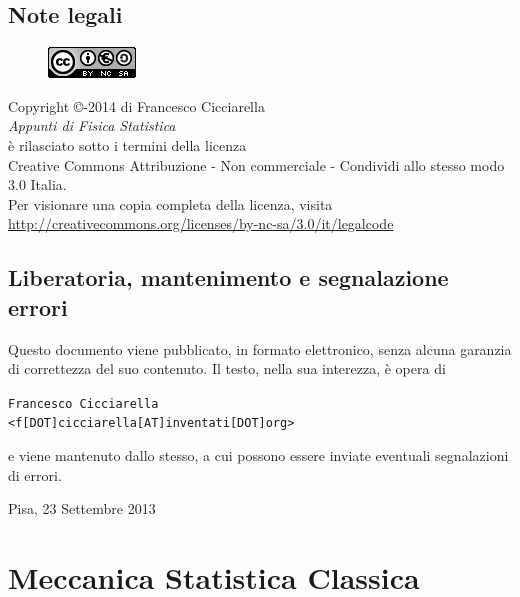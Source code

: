 \documentclass[10pt,a4paper]{report}
\theoremstyle{definition}
\numberwithin{equation}{section}
\begin{document}
\section*{Note legali}
\begin{center}
\begin{figure}[htbp]
\centering
\includegraphics[scale=1]{Addons/88x31.png}
\end{figure}
\vspace{0.5cm}
Copyright \copyright {}-2014 di Francesco Cicciarella \\
\textit{Appunti di Fisica Statistica} \\	
è rilasciato sotto i termini della licenza \\
Creative Commons Attribuzione - Non commerciale - Condividi allo stesso modo 3.0 Italia. \\
Per visionare una copia completa della licenza, visita \\
\url{http://creativecommons.org/licenses/by-nc-sa/3.0/it/legalcode}
\end{center}
\section*{Liberatoria, mantenimento e segnalazione errori}
Questo documento viene pubblicato, in formato elettronico, senza alcuna garanzia di correttezza del suo contenuto. Il testo, nella sua interezza, è opera di \\

\vspace{0.3cm}
\begin{flushleft}
\texttt{Francesco Cicciarella}\\
\texttt{<f[DOT]cicciarella[AT]inventati[DOT]org>}
\end{flushleft}
\vspace{0.3cm}
e viene mantenuto dallo stesso, a cui possono essere inviate eventuali segnalazioni di errori.
\vspace{1cm}
\begin{flushright}
Pisa, 23 Settembre 2013
\end{flushright}
\pagebreak


\tableofcontents
\pagebreak

\chapter{Meccanica Statistica Classica}
\end{document}
